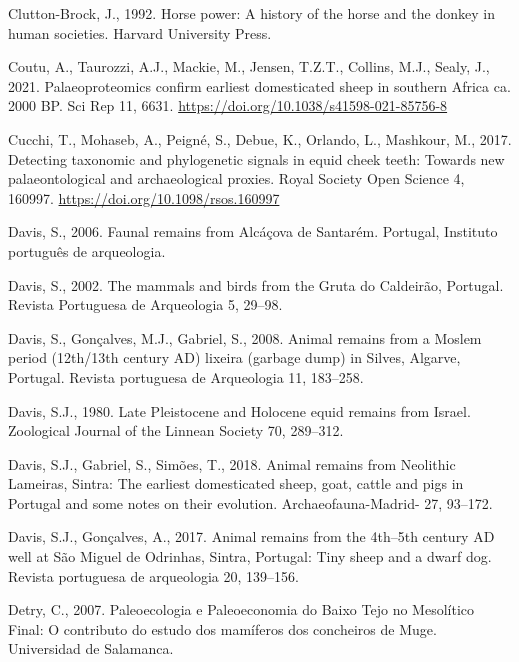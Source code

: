 \documentclass[preprint, 3p, authoryear]{elsarticle} %
\newlength{\cslhangindent}
\newlength{\cslentryspacingunit} %
\newenvironment{CSLReferences}[2] %
 {%
  \setlength{\parindent}{0pt}
  \ifodd #1
  \let\oldpar\par
  \def\par{\hangindent=\cslhangindent\oldpar}
  \fi
  \setlength{\parskip}{#2\cslentryspacingunit}
 }%
 {}
\begin{document}
\begin{CSLReferences}{1}{0}
\leavevmode{}%
Clutton-Brock, J., 1992. Horse power: A history of the horse and the donkey in human societies. {Harvard University Press}.

\leavevmode{}%
Coutu, A., Taurozzi, A.J., Mackie, M., Jensen, T.Z.T., Collins, M.J., Sealy, J., 2021. Palaeoproteomics confirm earliest domesticated sheep in southern {Africa} ca. 2000 {BP}. Sci Rep 11, 6631. \url{https://doi.org/10.1038/s41598-021-85756-8}

\leavevmode{}%
Cucchi, T., Mohaseb, A., Peigné, S., Debue, K., Orlando, L., Mashkour, M., 2017. Detecting taxonomic and phylogenetic signals in equid cheek teeth: Towards new palaeontological and archaeological proxies. Royal Society Open Science 4, 160997. \url{https://doi.org/10.1098/rsos.160997}

\leavevmode{}%
Davis, S., 2006. Faunal remains from {Alcáçova} de {Santarém}. Portugal, Instituto português de arqueologia.

\leavevmode{}%
Davis, S., 2002. The mammals and birds from the {Gruta} do {Caldeirão}, {Portugal}. Revista Portuguesa de Arqueologia 5, 29--98.

\leavevmode{}%
Davis, S., Gonçalves, M.J., Gabriel, S., 2008. Animal remains from a {Moslem} period (12th/13th century {AD}) lixeira (garbage dump) in {Silves}, {Algarve}, {Portugal}. Revista portuguesa de Arqueologia 11, 183--258.

\leavevmode{}%
Davis, S.J., 1980. Late {Pleistocene} and {Holocene} equid remains from {Israel}. Zoological Journal of the Linnean Society 70, 289--312.

\leavevmode{}%
Davis, S.J., Gabriel, S., Simões, T., 2018. Animal remains from {Neolithic Lameiras}, {Sintra}: The earliest domesticated sheep, goat, cattle and pigs in {Portugal} and some notes on their evolution. Archaeofauna-Madrid- 27, 93--172.

\leavevmode{}%
Davis, S.J., Gonçalves, A., 2017. Animal remains from the 4th--5th century {AD} well at {São Miguel} de {Odrinhas}, {Sintra}, {Portugal}: Tiny sheep and a dwarf dog. Revista portuguesa de arqueologia 20, 139--156.

\leavevmode{}%
Detry, C., 2007. Paleoecologia e {Paleoeconomia} do {Baixo Tejo} no {Mesolítico Final}: {O} contributo do estudo dos mamíferos dos concheiros de {Muge}. {Universidad de Salamanca}.


\end{CSLReferences}
\end{document}
